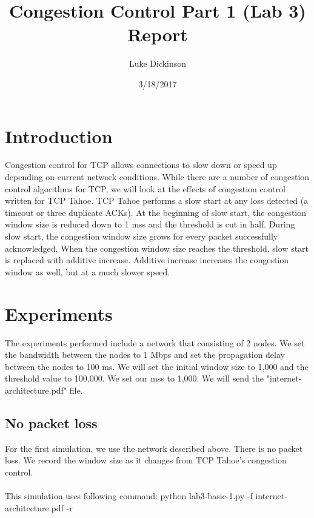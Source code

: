 \documentclass[fleqn,11pt]{article}
\begin{document}
\lstset{
  language=Python,
  basicstyle=\small,          %
  keywordstyle=\bfseries,
  identifierstyle=,           %
  commentstyle=,              %
  stringstyle=\ttfamily,      %
  showstringspaces=false,     %
  numbers=left,
  numberstyle=\tiny,
  numbersep=5pt,
  frame=tb,
}

\title{Congestion Control Part 1 (Lab 3) Report}

\author{Luke Dickinson}

\date{3/18/2017}

\maketitle

\section{Introduction}

Congestion control for TCP allows connections to slow down or speed up depending on current network conditions. While there are a number of congestion control algorithms for TCP, we will look at the effects of congestion control written for TCP Tahoe. TCP Tahoe performs a slow start at any loss detected (a timeout or three duplicate ACKs). At the beginning of slow start, the congestion window size is reduced down to 1 mss and the threshold is cut in half. During slow start, the congestion window size grows for every packet successfully acknowledged. When the congestion window size reaches the threshold, slow start is replaced with additive increase. Additive increase increases the congestion window as well, but at a much slower speed.

\section{Experiments}
The experiments performed include a network that consisting of 2 nodes. We set the bandwidth between the nodes to 1 Mbps and set the propagation delay between the nodes to 100 ms. We will set the initial window size to 1,000 and the threshold value to 100,000. We set our mss to 1,000. We will send the "internet-architecture.pdf" file.

\subsection{No packet loss}
For the first simulation, we use the network described above. There is no packet loss. We record the window size as it changes from TCP Tahoe's congestion control. \\\\
This simulation uses following command: python lab3-basic-1.py -f internet-architecture.pdf -r\\
\end{document}
